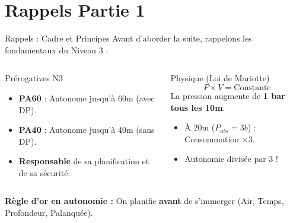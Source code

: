 \section{Rappels Partie 1}

\begin{frame}{Rappels : Cadre et Principes}
    Avant d'aborder la suite, rappelons les fondamentaux du Niveau 3 :

    \begin{columns}
        \begin{block}{Prérogatives N3}
            \begin{itemize}
                \item \textbf{PA60} : Autonome jusqu'à 60m (avec DP).
                \item \textbf{PA40} : Autonome jusqu'à 40m (sans DP).
                \item \textbf{Responsable} de sa planification et de sa sécurité.
            \end{itemize}
        \end{block}

        \begin{block}{Physique (Loi de Mariotte)}
            $$ P \times V = \text{Constante} $$
            La pression augmente de \textbf{1 bar tous les 10m}.
            \begin{itemize}
                \item À 20m ($P_{abs}=3b$) : Consommation $\times 3$.
                \item Autonomie divisée par 3 !
            \end{itemize}
        \end{block}
    \end{columns}
    
    \vspace{0.5cm}
    \textbf{Règle d'or en autonomie :} On planifie \textbf{avant} de s'immerger (Air, Temps, Profondeur, Palanquée).
\end{frame}

